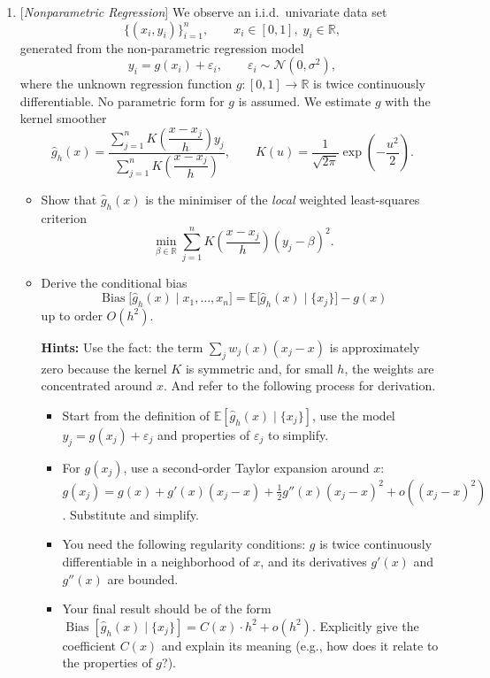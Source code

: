 \documentclass[10pt]{article}
\begin{document}
\begin{enumerate}
\item {} [\textit{Nonparametric Regression}]
We observe an i.i.d.\ univariate data set
\[
\{(x_i,y_i)\}_{i=1}^{n},\qquad x_i\in[0,1],\; y_i\in\mathbb{R},
\]
generated from the non-parametric regression model
\[
y_i = g(x_i)+\varepsilon_i,\qquad \varepsilon_i\sim\mathcal{N}(0,\sigma^{2}),
\]
where the unknown regression function $g\colon[0,1]\to\mathbb{R}$ is twice continuously differentiable.
No parametric form for $g$ is assumed.
We estimate $g$ with the kernel smoother
\[
\hat{g}_{h}(x)=\frac{\sum_{j=1}^{n}K \left(\dfrac{x-x_j}{h}\right)y_j}{\sum_{j=1}^{n}K \left(\dfrac{x-x_j}{h}\right)},
\qquad
K(u)=\frac{1}{\sqrt{2\pi}}\exp \left(-\frac{u^{2}}{2}\right).
\]
\begin{itemize}
	\item[(a)]  Show that $\hat{g}_{h}(x)$ is the minimiser of the \emph{local} weighted least-squares criterion
	\[
	\min_{\beta\in\mathbb{R}}\sum_{j=1}^{n}K \left(\frac{x-x_j}{h}\right) (y_j-\beta)^{2}.
	\]
	
	\item[(b)]  Derive the conditional bias
	\[
	\operatorname{Bias}\bigl[\hat{g}_{h}(x)\mid x_{1},\dots,x_{n}\bigr]
	=\mathbb{E} \bigl[\hat{g}_{h}(x)\mid\{x_{j}\}\bigr]-g(x)
	\]
	up to order $O(h^{2})$. 
	
	\textbf{Hints:} Use the fact: the term $\sum_j w_j(x)(x_j - x)$ is approximately zero because the kernel $K$ is symmetric and, for small $h$, the weights are concentrated around $x$. And refer to the following process for derivation. 
	\begin{itemize}
		\item[1.] Start from the definition of $\mathbb{E}[\hat{g}_{h}(x) \mid \{x_{j}\}]$, use the model $y_j = g(x_j) + \varepsilon_j$ and properties of $\varepsilon_j$ to simplify.
		\item[2.] For $g(x_j)$, use a second-order Taylor expansion around $x$: $g(x_j) = g(x) + g'(x)(x_j - x) + \frac{1}{2}g''(x)(x_j - x)^2 + o((x_j-x)^2)$. Substitute and simplify.
		\item[3.] You need the following regularity conditions: $g$ is twice continuously differentiable in a neighborhood of $x$, and its derivatives $g'(x)$ and $g''(x)$ are bounded.
		\item[4.] Your final result should be of the form $\operatorname{Bias}[\hat{g}_{h}(x)\mid \{x_j\}] = C(x) \cdot h^2 + o(h^2)$. Explicitly give the coefficient $C(x)$ and explain its meaning (e.g., how does it relate to the properties of $g$?).
	\end{itemize}
	

\end{itemize}
\end{enumerate}
\end{document}
